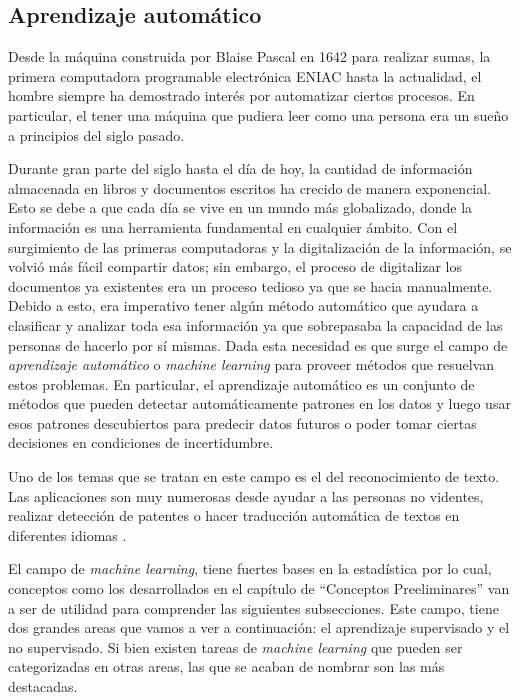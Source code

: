 \subsection{Aprendizaje automático}

	Desde la máquina construida por Blaise Pascal en 1642 para realizar sumas, la primera computadora programable electrónica ENIAC hasta la actualidad, el hombre siempre ha demostrado interés por automatizar ciertos procesos. En particular, el tener una máquina que pudiera leer como una persona era un sueño a principios del siglo pasado.
	
	Durante gran parte del siglo  hasta el día de hoy, la cantidad de información almacenada en libros y documentos escritos ha crecido de manera exponencial. Esto se debe a que cada día se vive en un mundo más globalizado, donde la información es una herramienta fundamental en cualquier ámbito. Con el surgimiento de las primeras computadoras y la digitalización de la información, se volvió más fácil compartir datos; sin embargo, el proceso de digitalizar los documentos ya existentes era un proceso tedioso ya que se hacia manualmente. Debido a esto, era imperativo tener algún método automático que ayudara a clasificar y analizar toda esa información ya que sobrepasaba la capacidad de las personas de hacerlo por sí mismas. Dada esta necesidad es que surge el campo de \textit{aprendizaje automático} o \textit{machine learning} para proveer métodos que resuelvan estos problemas. En particular, el aprendizaje automático es un conjunto de métodos que pueden detectar automáticamente patrones en los datos y luego usar esos patrones descubiertos para predecir datos futuros o poder tomar ciertas decisiones en condiciones de incertidumbre. 
	
	Uno de los temas que se tratan en este campo es el del reconocimiento de texto. Las aplicaciones son muy numerosas desde ayudar a las personas no videntes, realizar detección de patentes o hacer traducción automática de textos en diferentes idiomas \cite{Optelec, DAB, WordLens}.
	 
	 El campo de \textit{machine learning}, tiene fuertes bases en la estadística por lo cual, conceptos como los desarrollados en el capítulo de ``Conceptos Preeliminares'' van a ser de utilidad para comprender las siguientes subsecciones. Este campo, tiene dos grandes areas que vamos a ver a continuación: el aprendizaje supervisado y el no supervisado. Si bien existen tareas de \textit{machine learning} que pueden ser categorizadas en otras areas, las que se acaban de nombrar son las más destacadas.
	
